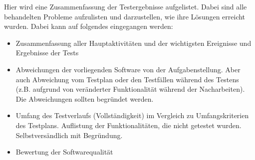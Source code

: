 Hier wird eine Zusammenfassung der Testergebnisse aufgelistet. Dabei sind alle
behandelten Probleme aufzulisten und darzustellen, wie ihre Lösungen erreicht
wurden. Dabei kann auf folgendes eingegangen werden:
\begin{itemize}
\item Zusammenfassung aller Hauptaktivitäten und der wichtigsten Ereignisse und Ergebnisse der Tests
\item Abweichungen der vorliegenden Software von der Aufgabenstellung. Aber auch Abweichung vom Testplan oder den Testfällen während des Testens (z.B.
   aufgrund von veränderter Funktionalität während der Nacharbeiten). Die
   Abweichungen sollten begründet werden.
\item Umfang des Testverlaufs (Vollständigkeit) im Vergleich zu Umfangskriterien
   des Testplans. Auflistung der Funktionalitäten, die nicht getestet wurden.
   Selbstversändlich mit Begründung.
\item Bewertung der Softwarequalität
\end{itemize}
